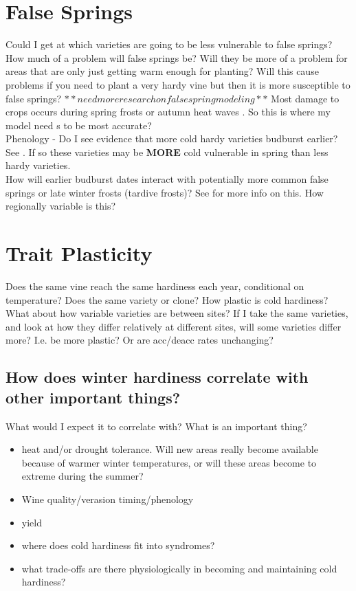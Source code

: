 \documentclass[11pt,letter]{article}
\begin{document}
\section{False Springs} 
Could I get at which varieties are going to be less vulnerable to false springs? \\

How much of a problem will false springs be? Will they be more of a problem for areas that are only just getting warm enough for planting? Will this cause problems if you need to plant a very hardy vine but then it is more susceptible to false springs? $**need more research on false spring modeling**$
Most damage to crops occurs during spring frosts or autumn heat waves \citep{Charrier2013}. So this is where my model need s to be most accurate? \\

Phenology - Do I see evidence that more cold hardy varieties budburst earlier? See \cite{Ferguson2014}. If so these varieties may be \textbf{MORE} cold vulnerable in spring than less hardy varieties. \\ 

How will earlier budburst dates interact with potentially more common false springs or late winter frosts (tardive frosts)? See \cite{Sgubin2018} for more info on this. How regionally variable is this?\\

\section{Trait Plasticity} 
Does the same vine reach the same hardiness each year, conditional on temperature? Does the same variety or clone? How plastic is cold hardiness? \\

What about how variable varieties are between sites? If I take the same varieties, and look at how they differ relatively at different sites, will some varieties differ more? I.e. be more plastic? Or are acc/deacc rates unchanging?\\


\subsection{How does winter hardiness correlate with other important things?}
What would I expect it to correlate with? What is an important thing?
\begin{itemize}
\item heat and/or drought tolerance. Will new areas really become available because of warmer winter temperatures, or will these areas become to extreme during the summer?
\item Wine quality/verasion timing/phenology{}
\item yield
\item where does cold hardiness fit into syndromes?
\item what trade-offs are there physiologically in becoming and maintaining cold hardiness?  
\end{itemize}
\end{document}
